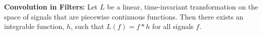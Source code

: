 {\bf Convolution in Filters:} Let $L$ be a linear, time-invariant transformation on the space of signals that are piecewise continuous functions. Then there exists an integrable function, $h$, such that $L(f)=f*h$ for all signals $f$.